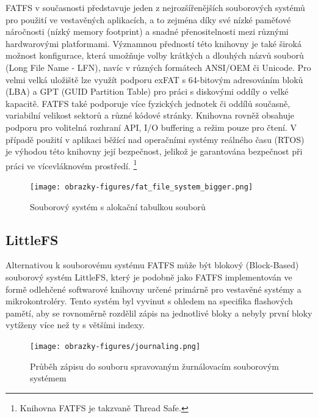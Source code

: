 FATFS v současnosti představuje jeden z nejrozšířenějších souborových systémů pro použití ve vestavěných aplikacích, a to zejména díky své nízké paměťové náročnosti (nízký memory footprint) a snadné přenositelnosti mezi různými hardwarovými platformami. Významnou předností této knihovny je také široká možnost konfigurace, která umožňuje volby krátkých a dlouhých názvů souborů (Long File Name - LFN), navíc v různých formátech ANSI/OEM či Unicode. Pro velmi velká uložiště lze využít podporu exFAT s 64-bitovým adresováním bloků (LBA) a GPT (GUID Partition Table) pro práci s diskovými oddíly o velké kapacitě. FATFS také podporuje více fyzických jednotek či oddílů současně, variabilní velikost sektorů a různé kódové stránky. Knihovna rovněž obsahuje podporu pro volitelná rozhraní API, I/O buffering a režim pouze pro čtení. V případě použití v aplikaci běžící nad operačními systémy reálného času (RTOS) je výhodou této knihovny její bezpečnost, jelikož je garantována bezpečnost při práci ve vícevláknovém prostředí. \footnote{Knihovna FATFS je takzvaně Thread Safe.} \cite{elm_fat_filesystem_module}


\begin{figure}[h]
    \centering
    \texttt{[image: obrazky-figures/fat\_file\_system\_bigger.png]}
    
    \caption{Souborový systém s alokační tabulkou souborů \cite{recoverit_fat_filesystem}}
    \label{fig:fat-file-system-structure}
\end{figure}


\subsection{LittleFS}
Alternativou k souborovému systému FATFS může být blokový (Block-Based) souborový systém LittleFS, který je podobně jako FATFS implementován ve formě odlehčené softwarové knihovny určené primárně pro vestavěné systémy a mikrokontroléry.  Tento systém byl vyvinut s ohledem na specifika flashových pamětí, aby se rovnoměrně rozdělil zápis na jednotlivé bloky a nebyly první bloky vytíženy více než ty s většími indexy.

\begin{figure}[h]
    \centering
    \texttt{[image: obrazky-figures/journaling.png]}
    
    \caption{Průběh zápisu do souboru spravovaným žurnálovacím souborovým systémem \cite{architecture_and_design_of_the_linux_storage_stack}}
    \label{fig:journaling}
\end{figure}

